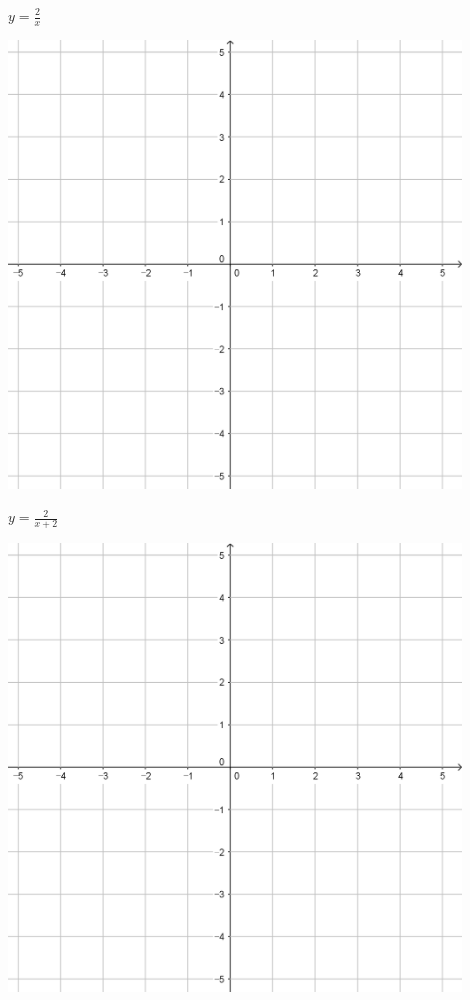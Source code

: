 \documentclass{oblivoir}
\begin{document}
\clearpage
\begin{minipage}{0.45\textwidth}\centering
\(y=\frac2x\)
\par\bigskip\includegraphics[width=0.9\textwidth]{55}
\end{minipage}
\begin{minipage}{0.45\textwidth}\centering
\(y=\frac2{x+2}\)
\par\bigskip\includegraphics[width=0.9\textwidth]{55}
\end{minipage}\bigskip\bigskip\par
\end{document}
